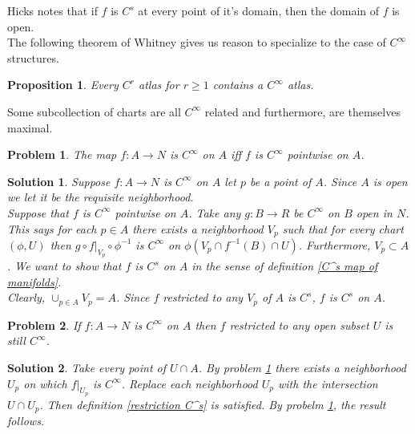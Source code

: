 \documentclass{article}
\theoremstyle{problemstyle}
\newtheorem{problem}{Problem}
\theoremstyle{problemstyle}
\newtheorem{solution}{Solution}
\theoremstyle{problemstyle}
\theoremstyle{problemstyle}
\newtheorem{proposition}{Proposition}
\theoremstyle{problemstyle}
\theoremstyle{problemstyle}
\begin{document}
Hicks notes that if $f$ is $C^s$ at every point of it's domain, then the domain of $f$ is open.\\ 

The following theorem of Whitney gives us reason to specialize to the case of $C^\infty$ structures. 

\begin{proposition}
Every $C^r$ atlas for $r \geq 1$ contains a $C^\infty$ atlas.
\end{proposition}

Some subcollection of charts are all $C^\infty$ related and furthermore, are themselves maximal. 

\begin{problem}\label{pointwise C infinity}
The map $f:A \rightarrow N$ is $C^\infty$ on $A$ iff $f$ is $C^\infty$ pointwise on $A$.  
\end{problem}

\begin{solution}
Suppose $f:A \rightarrow N$ is $C^\infty$ on $A$ let $p$ be a point of $A$. Since $A$ is open we let it be the requisite neighborhood.\\

Suppose that $f$ is $C^\infty$ pointwise on $A$. Take any $g:B \rightarrow R$ be $C^\infty$ on $B$ open in $N$. This says for each $p \in A$ there exists a neighborhood $V_p$ such that for every chart $(\phi, U)$ then $g \circ f|_{V_p} \circ \phi^{-1}$ is $C^\infty$ on $\phi(V_p \cap f^{-1}(B) \cap U)$. Furthermore, $V_p \subset A$. We want to show that $f$ is $C^s$ on $A$ in the sense of definition \ref{C^s map of manifolds}.\\ 

Clearly, $\cup_{p \in A}V_p = A$. Since $f$ restricted to any $V_p$ of $A$ is $C^s$, $f$ is $C^s$ on $A$. \end{solution}


\begin{problem}
If $f:A \rightarrow N$ is $C^\infty$ on $A$ then $f$ restricted to any open subset $U$ is still $C^\infty$.
\end{problem}

\begin{solution}
Take every point of $U \cap A$. By problem \ref{pointwise C infinity} there exists a neighborhood $U_p$ on which $f|_{U_p}$ is $C^\infty$.  Replace each neighborhood $U_p$ with the intersection $U \cap U_p$. Then definition \ref{restriction C^s} is satisfied. By probelm \ref{pointwise C infinity}, the result follows. 
\end{solution}
\end{document}
